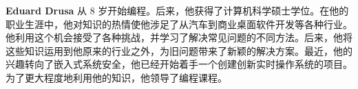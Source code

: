 \textbf{Eduard Drusa} 从 8 岁开始编程。后来，他获得了计算机科学硕士学位。在他的职业生涯中，他对知识的热情使他涉足了从汽车到商业桌面软件开发等各种行业。他利用这个机会接受了各种挑战，并学习了解决常见问题的不同方法。后来，他将这些知识运用到他原来的行业之外，为旧问题带来了新颖的解决方案。最近，他的兴趣转向了嵌入式系统安全，他已经开始着手一个创建创新实时操作系统的项目。为了更大程度地利用他的知识，他领导了编程课程。


